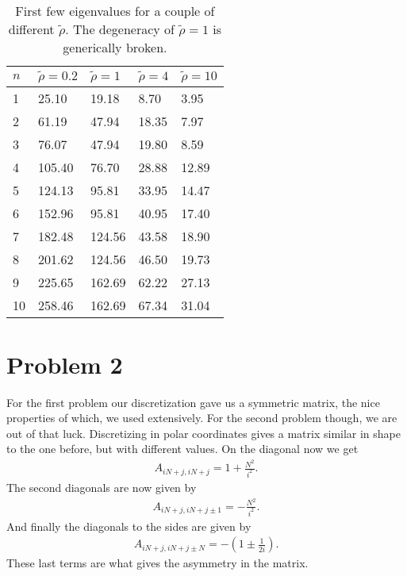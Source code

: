 \documentclass[10pt,a4paper,twocolumn]{article}
\begin{document}
\begin{table}
    \centering
    \begin{tabular}{|l|l|l|l|l|}
    \hline
    $n$ & $\tilde{\rho}=0.2$ & $\tilde{\rho}=1$ & $\tilde{\rho}=4$ & $\tilde{\rho}=10$\\ \hline \hline
    1  & 25.10 & 19.18 & 8.70 & 3.95 \\ \hline
    2  & 61.19 & 47.94 & 18.35 & 7.97 \\ \hline
    3  & 76.07 & 47.94 & 19.80 & 8.59 \\ \hline
    4  & 105.40 & 76.70 & 28.88 & 12.89 \\ \hline
    5  & 124.13 & 95.81 & 33.95 & 14.47 \\ \hline
    6  & 152.96 & 95.81 & 40.95 & 17.40 \\ \hline
    7  & 182.48 & 124.56 & 43.58 & 18.90 \\ \hline
    8  & 201.62 & 124.56 & 46.50 & 19.73 \\ \hline
    9  & 225.65 & 162.69 & 62.22 & 27.13 \\ \hline
    10  & 258.46 & 162.69 & 67.34 & 31.04 \\ \hline
    \end{tabular}
    \caption{First few eigenvalues for a couple of different $\tilde{\rho}$. The degeneracy of $\tilde{\rho} = 1$ is generically broken.}
    \label{tab:Fvals}
\end{table}

\section{Problem 2}

For the first problem our discretization gave us a symmetric matrix, the nice properties of which, we used extensively. For the second problem though, we are out of that luck. Discretizing in polar coordinates gives a matrix similar in shape to the one before, but with different values. On the diagonal now we get
%
\begin{align}
    A_{iN+j,iN+j} = 1 + \frac{N^2}{i^2}.
\end{align}
%
The second diagonals are now given by
%
\begin{align}
    A_{iN+j,iN+j\pm1} = -\frac{N^2}{i^2}.
\end{align}
%
And finally the diagonals to the sides are given by
%
\begin{align}
    A_{iN+j,iN+j\pm N} = - (1 \pm \frac{1}{2 i}).
\end{align}
%
These last terms are what gives the asymmetry in the matrix.
\end{document}
